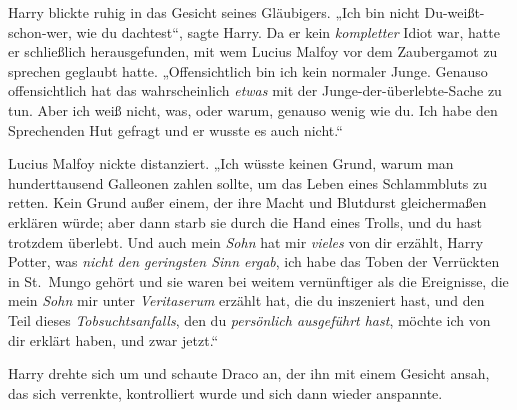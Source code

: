 Harry blickte ruhig in das Gesicht seines Gläubigers.
„Ich bin nicht Du-weißt-schon-wer, wie du dachtest“, sagte Harry. Da er kein \emph{kompletter} Idiot war, hatte er schließlich herausgefunden, mit wem Lucius Malfoy vor dem Zaubergamot zu sprechen geglaubt hatte.
„Offensichtlich bin ich kein normaler Junge. Genauso offensichtlich hat das wahrscheinlich \emph{etwas} mit der Junge-der-überlebte-Sache zu tun. Aber ich weiß nicht, was, oder warum, genauso wenig wie du. Ich habe den Sprechenden Hut gefragt und er wusste es auch nicht.“

Lucius Malfoy nickte distanziert.
„Ich wüsste keinen Grund, warum man hunderttausend Galleonen zahlen sollte, um das Leben eines Schlammbluts zu retten. Kein Grund außer einem, der ihre Macht und Blutdurst gleichermaßen erklären würde; aber dann starb sie durch die Hand eines Trolls, und du hast trotzdem überlebt. Und auch mein \emph{Sohn} hat mir \emph{vieles} von dir erzählt, Harry Potter, was \emph{nicht den geringsten Sinn ergab}, ich habe das Toben der Verrückten in St.~Mungo gehört und sie waren bei weitem vernünftiger als die Ereignisse, die mein \emph{Sohn} mir unter \emph{Veritaserum} erzählt hat, die du inszeniert hast, und den Teil dieses \emph{Tobsuchtsanfalls}, den du \emph{persönlich ausgeführt hast}, möchte ich von dir erklärt haben, und zwar jetzt.“

Harry drehte sich um und schaute Draco an, der ihn mit einem Gesicht ansah, das sich verrenkte, kontrolliert wurde und sich dann wieder anspannte.

